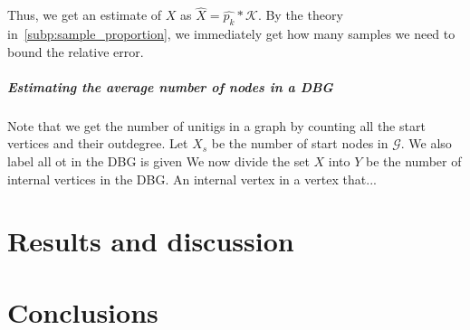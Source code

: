 \documentclass[a4paper,11pt]{article}
\begin{document}
 Thus, we get an estimate of $X$ as $\hat{X} = \hat{p_k}*\mathcal{K}$.  By the theory in~\ref{subp:sample_proportion}, we immediately get how many samples we need to bound the relative error. 


\subparagraph{Estimating the average number of nodes in a DBG} %
\label{subp:estimating_the_average_number_of_nodes_in_a_dbg}
 Note that we get the number of unitigs in a graph by counting all the start vertices and their outdegree. Let $X_s$ be the number of start nodes in $\mathcal{G}$. We also label all ot in the DBG is given We now divide the set $X$ into $Y$ be the number of internal vertices in the DBG. An internal vertex in a vertex that... 




\section{Results and discussion} %
\label{sec:results_and_discussion}


\section{Conclusions} %
\label{sec:conclusions}

\end{document}
